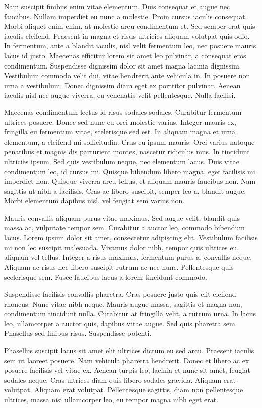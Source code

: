 Nam suscipit finibus enim vitae elementum. Duis consequat et augue nec faucibus. Nullam imperdiet eu nunc a molestie. Proin cursus iaculis consequat. Morbi aliquet enim enim, at molestie arcu condimentum et. Sed semper erat quis iaculis eleifend. Praesent in magna et risus ultricies aliquam volutpat quis odio. In fermentum, ante a blandit iaculis, nisl velit fermentum leo, nec posuere mauris lacus id justo. Maecenas efficitur lorem sit amet leo pulvinar, a consequat eros condimentum. Suspendisse dignissim dolor sit amet magna lacinia dignissim. Vestibulum commodo velit dui, vitae hendrerit ante vehicula in. In posuere non urna a vestibulum. Donec dignissim diam eget ex porttitor pulvinar. Aenean iaculis nisl nec augue viverra, eu venenatis velit pellentesque. Nulla facilisi.

Maecenas condimentum lectus id risus sodales sodales. Curabitur fermentum ultrices posuere. Donec sed nunc eu orci molestie varius. Integer mauris ex, fringilla eu fermentum vitae, scelerisque sed est. In aliquam magna et urna elementum, a eleifend mi sollicitudin. Cras eu ipsum mauris. Orci varius natoque penatibus et magnis dis parturient montes, nascetur ridiculus mus. In tincidunt ultricies ipsum. Sed quis vestibulum neque, nec elementum lacus. Duis vitae condimentum leo, id cursus mi. Quisque bibendum libero magna, eget facilisis mi imperdiet non. Quisque viverra arcu tellus, et aliquam mauris faucibus non. Nam sagittis ut nibh a facilisis. Cras ac libero suscipit, semper leo a, blandit augue. Morbi elementum dapibus nisl, vel feugiat sem varius non.

Mauris convallis aliquam purus vitae maximus. Sed augue velit, blandit quis massa ac, vulputate tempor sem. Curabitur a auctor leo, commodo bibendum lacus. Lorem ipsum dolor sit amet, consectetur adipiscing elit. Vestibulum facilisis mi non leo suscipit malesuada. Vivamus dolor nibh, tempor quis ultrices eu, aliquam vel tellus. Integer a risus maximus, fermentum purus a, convallis neque. Aliquam ac risus nec libero suscipit rutrum ac nec nunc. Pellentesque quis scelerisque sem. Fusce faucibus lacus a lorem tincidunt commodo.

Suspendisse facilisis convallis pharetra. Cras posuere justo quis elit eleifend rhoncus. Nunc vitae nibh neque. Mauris augue massa, sagittis et magna non, condimentum tincidunt nulla. Curabitur at fringilla velit, a rutrum urna. In lacus leo, ullamcorper a auctor quis, dapibus vitae augue. Sed quis pharetra sem. Phasellus sed finibus risus. Suspendisse potenti.

Phasellus suscipit lacus sit amet elit ultrices dictum eu sed arcu. Praesent iaculis sem ut laoreet posuere. Nam vehicula pharetra hendrerit. Donec et libero ac ex posuere facilisis vel vitae ex. Aenean turpis leo, lacinia et nunc sit amet, feugiat sodales neque. Cras ultrices diam quis libero sodales gravida. Aliquam erat volutpat. Aliquam erat volutpat. Pellentesque sagittis, diam non pellentesque ultrices, massa nisi ullamcorper leo, eu tempor magna nibh eget erat.